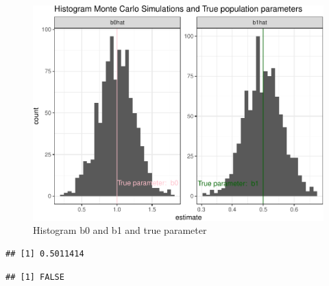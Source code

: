 \documentclass[]{book}
\newenvironment{Shaded}{\begin{snugshade}}{\end{snugshade}}
\newcommand{\DecValTok}[1]{\textcolor[rgb]{0.00,0.00,0.81}{#1}}
\newcommand{\KeywordTok}[1]{\textcolor[rgb]{0.13,0.29,0.53}{\textbf{#1}}}
\newcommand{\NormalTok}[1]{#1}
\newcommand{\OperatorTok}[1]{\textcolor[rgb]{0.81,0.36,0.00}{\textbf{#1}}}
\newcommand{\StringTok}[1]{\textcolor[rgb]{0.31,0.60,0.02}{#1}}
\begin{document}
\begin{figure}

{\centering \includegraphics[width=0.8\linewidth]{MEM5220_R_files/figure-latex/fig8-1} 

}

\caption{Histogram b0 and b1 and true parameter}\label{fig:fig8}
\end{figure}

\begin{Shaded}
\end{Shaded}

\begin{verbatim}
## [1] 0.5011414
\end{verbatim}

\begin{Shaded}
\end{Shaded}

\begin{verbatim}
## [1] FALSE
\end{verbatim}
\end{document}
